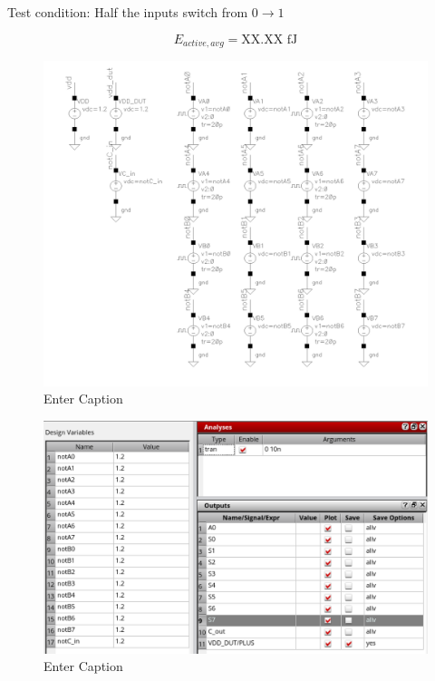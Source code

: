 \documentclass[12pt,letterpaper]{article}
\begin{document}
Test condition: Half the inputs switch from $0 \rightarrow 1$

\begin{equation}
E_{active,avg} = \text{XX.XX fJ}
\end{equation}

\begin{figure}[H]
    \centering
    \includegraphics[width=\linewidth]{writeup//figures//baseline//active_energy/avg_switching_energy_inputs.png}
    \caption{Enter Caption}
\end{figure}

\begin{figure}[H]
    \centering
    \includegraphics[width=\linewidth]{writeup//figures//baseline//active_energy/avg_switching_energy_adel.png}
    \caption{Enter Caption}
\end{figure}
\end{document}
